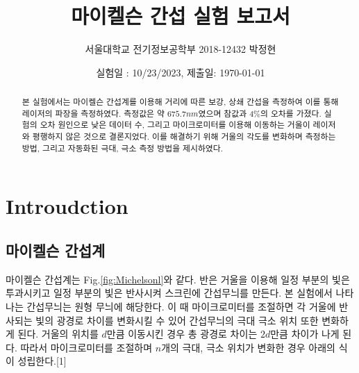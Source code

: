 \documentclass[%
 reprint,
 amsmath,amssymb,
 aps,
]{revtex4-2}
\begin{document}
\title{마이켈슨 간섭 실험 보고서}

\author{서울대학교 전기정보공학부 2018-12432 박정현}
\date{실험일 : 10/23/2023, 제출일: \today}%

\begin{abstract}
본 실험에서는 마이켈슨 간섭계를 이용해 거리에 따른 보강, 상쇄 간섭을 측정하여 이를 통해 레이저의 파장을 측정하였다. 측정값은 약 $675.7nm$였으며 참값과 $4\%$의 오차를 가졌다. 실험의 오차 원인으로 낮은 데이터 수, 그리고 마이크로미터를 이용해 이동하는 거울이 레이저와 평행하지 않은 것으로 결론지었다. 이를 해결하기 위해 거울의 각도를 변화하며 측정하는 방법, 그리고 자동화된 극대, 극소 측정 방법을 제시하였다.
\end{abstract}

\maketitle


\section{\label{sec:level1}Introudction}
\subsection{\label{sec:level2}마이켈슨 간섭계}
마이켈슨 간섭계는 Fig.\ref{fig:Michelsonl}와 같다. 반은 거울을 이용해 일정 부분의 빛은 투과시키고 일정 부분의 빛은 반사시켜 스크린에 간섭무늬를 만든다. 본 실험에서 나타나는 간섭무늬는 원형 무늬에 해당한다. 이 때 마이크로미터를 조절하면 각 거울에 반사되는 빛의 광경로 차이를 변화시킬 수 있어 간섭무늬의 극대 극소 위치 또한 변화하게 된다. 거울의 위치를 $d$만큼 이동시킨 경우 총 광경로 차이는 $2d$만큼 차이가 나게 된다. 따라서 마이크로미터를 조절하며 $n$개의 극대, 극소 위치가 변화한 경우 아래의 식이 성립한다.[1]
\end{document}
